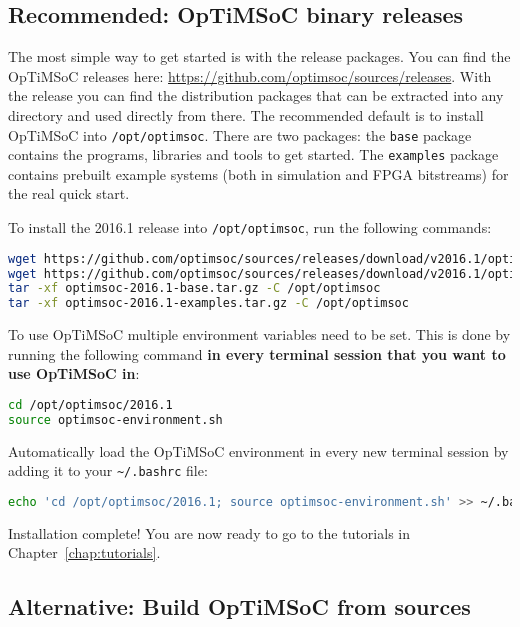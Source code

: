\subsection{Recommended: OpTiMSoC binary releases}
The most simple way to get started is with the release packages. You
can find the OpTiMSoC releases here:
\url{https://github.com/optimsoc/sources/releases}. With the release
you can find the distribution packages that can be extracted into any
directory and used directly from there. The recommended default is to
install OpTiMSoC into \verb|/opt/optimsoc|. There are two packages:
the \verb|base| package contains the programs, libraries and tools
to get started. The \verb|examples| package contains prebuilt example systems (both in simulation and FPGA bitstreams) for the real quick start.

To install the 2016.1 release into \verb|/opt/optimsoc|, run the following commands:

\begin{lstlisting}[language=sh]
wget https://github.com/optimsoc/sources/releases/download/v2016.1/optimsoc-2016.1-base.tar.gz
wget https://github.com/optimsoc/sources/releases/download/v2016.1/optimsoc-2016.1-examples.tar.gz
tar -xf optimsoc-2016.1-base.tar.gz -C /opt/optimsoc
tar -xf optimsoc-2016.1-examples.tar.gz -C /opt/optimsoc
\end{lstlisting}

To use OpTiMSoC multiple environment variables need to be set.
This is done by running the following command \textbf{in every terminal session that you want to use OpTiMSoC in}:

\begin{lstlisting}[language=sh]
cd /opt/optimsoc/2016.1
source optimsoc-environment.sh
\end{lstlisting}

\begin{docnote}
Automatically load the OpTiMSoC environment in every new terminal session by adding it to your \verb|~/.bashrc| file:

\begin{lstlisting}[language=sh]
echo 'cd /opt/optimsoc/2016.1; source optimsoc-environment.sh' >> ~/.bashrc
\end{lstlisting}
\end{docnote}

\medskip
Installation complete!
You are now ready to go to the tutorials in Chapter~\ref{chap:tutorials}.


\subsection{Alternative: Build OpTiMSoC from sources}

